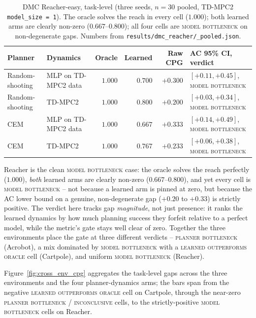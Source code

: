 \documentclass[10pt,letterpaper]{article}
\begin{document}
\begin{table}[t]
  \centering
  \small
  \begin{tabular}{llrrrl}
    \toprule
    Planner & Dynamics & Oracle & Learned & Raw CPG & AC 95\% CI, verdict \\
    \midrule
    Random-shooting & MLP on TD-MPC2 data & $1.000$ & $0.700$ & $+0.300$ & $[+0.11, +0.45]$, \textsc{model bottleneck} \\
    Random-shooting & TD-MPC2 & $1.000$ & $0.800$ & $+0.200$ & $[+0.03, +0.34]$, \textsc{model bottleneck} \\
    CEM & MLP on TD-MPC2 data & $1.000$ & $0.667$ & $+0.333$ & $[+0.14, +0.49]$, \textsc{model bottleneck} \\
    CEM & TD-MPC2 & $1.000$ & $0.767$ & $+0.233$ & $[+0.06, +0.38]$, \textsc{model bottleneck} \\
    \bottomrule
  \end{tabular}
  \caption{DMC Reacher-easy, task-level (three seeds, $n = 30$ pooled, TD-MPC2 \texttt{model\_size = 1}). The oracle solves the reach in every cell ($1.000$); both learned arms are clearly non-zero ($0.667$--$0.800$); all four cells are \textsc{model bottleneck} on non-degenerate gaps. Numbers from \texttt{results/dmc\_reacher/\*\_pooled.json}.}
  \label{tab:reacher}
\end{table}

Reacher is the clean \textsc{model bottleneck} case: the oracle solves the reach perfectly ($1.000$), \emph{both} learned arms are clearly non-zero ($0.667$--$0.800$), and yet every cell is \textsc{model bottleneck} -- not because a learned arm is pinned at zero, but because the AC lower bound on a genuine, non-degenerate gap ($+0.20$ to $+0.33$) is strictly positive. The verdict here tracks gap \emph{magnitude}, not just presence: it ranks the learned dynamics by how much planning success they forfeit relative to a perfect model, while the metric's gate stays well clear of zero. Together the three environments place the gate at three different verdicts -- \textsc{planner bottleneck} (Acrobot), a mix dominated by \textsc{model bottleneck} with a \textsc{learned outperforms oracle} cell (Cartpole), and uniform \textsc{model bottleneck} (Reacher).



Figure~\ref{fig:cross_env_cpg} aggregates the task-level gaps across the three environments and the four planner-dynamics arms; the bars span from the negative \textsc{learned outperforms oracle} cell on Cartpole, through the near-zero \textsc{planner bottleneck} / \textsc{inconclusive} cells, to the strictly-positive \textsc{model bottleneck} cells on Reacher.
\end{document}
